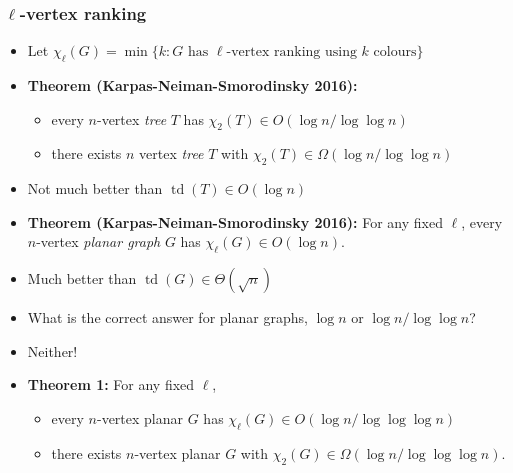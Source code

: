 \documentclass[xcolor=dvipsnames]{beamer}
\DeclareMathOperator{\td}{td}
\begin{document}
\begin{frame}
  \frametitle{$\ell$-vertex ranking}

  \begin{itemize}[<+->]
    \item Let $\chi_\ell(G)=\min\{k:\mbox{$G$ has $\ell$-vertex ranking using $k$ colours}\}$

    \item[]\textbf{Theorem (Karpas-Neiman-Smorodinsky 2016):}
    \begin{itemize}
      \item every $n$-vertex \emph{tree} $T$ has $\chi_2(T)\in O(\log n/\log\log n)$
      \item there exists $n$ vertex \emph{tree} $T$ with $\chi_2(T)\in\Omega(\log n/\log\log n)$
    \end{itemize}

    \item Not much better than $\td(T)\in O(\log n)$\vspace{.5cm}

    \item[]\textbf{Theorem (Karpas-Neiman-Smorodinsky 2016):} For any fixed $\ell$, every $n$-vertex \emph{planar graph} $G$ has $\chi_\ell(G)\in O(\log n)$.

    \item Much better than $\td(G)\in\Theta(\sqrt{n})$\vspace{.5cm}

    \item What is the correct answer for planar graphs, \newline $\log n$ or $\log n/\log\log n$?

    \item Neither!

    \item[]\textbf{Theorem 1: } For any fixed $\ell$,
    \begin{itemize}[<10->]
      \item every $n$-vertex planar $G$ has $\chi_\ell(G)\in O(\log n/\log\log\log n)$
      \item there exists $n$-vertex planar $G$ with $\chi_2(G)\in\Omega(\log n/\log\log\log n)$.
    \end{itemize}
  \end{itemize}
\end{frame}
\end{document}
